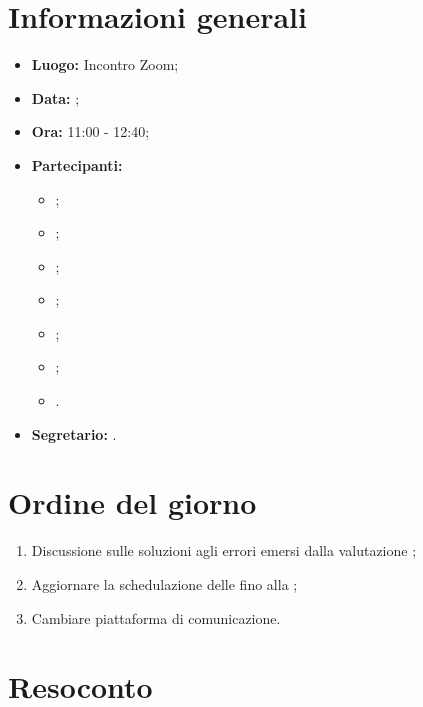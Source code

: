 \section{Informazioni generali}
\begin{itemize}
\item \textbf{Luogo:} Incontro Zoom;
\item \textbf{Data:} \Data;
\item \textbf{Ora:} 11:00 - 12:40;
\item \textbf{Partecipanti:}
	\begin{itemize}
		\item \BL{}; 
		\item \FF{};
		\item \MM{}; 
		\item \PC{};
		\item \TG{};
		\item \TL{};
		\item \VD{}.
	\end{itemize} 
\item \textbf{Segretario:} \TL{}.
\end{itemize}

\section{Ordine del giorno}
\begin{enumerate}
 \item Discussione sulle soluzioni agli errori emersi dalla valutazione ;
 \item Aggiornare la schedulazione delle  fino alla ;
 \item Cambiare piattaforma di comunicazione.
\end{enumerate}

\section{Resoconto}
